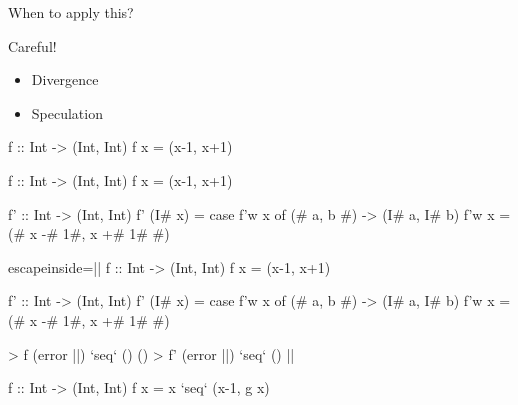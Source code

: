 \documentclass{haskellbeamer}
\begin{document}
\begin{frame}[fragile]{When to apply this?}
    \begin{minipage}{0.39\textwidth}
      Careful!
      \begin{itemize}
        \item<1-> Divergence
        \item<4-> Speculation
      \end{itemize}
    \end{minipage}%
    \begin{minipage}{0.6\textwidth}
      \begin{center}
        \begin{overprint}
          \begin{haskell}
            f :: Int -> (Int, Int)
            f x = (x-1, x+1)
          \end{haskell}
          \begin{haskell}
            f :: Int -> (Int, Int)
            f x = (x-1, x+1)
            
            f' :: Int -> (Int, Int)
            f' (I# x) = case f'w x of
              (# a, b #) -> (I# a, I# b)
            f'w x = (# x -# 1#, x +# 1# #)
          \end{haskell}
          \begin{haskell*}{escapeinside=||}
            f :: Int -> (Int, Int)
            f x = (x-1, x+1)
            
            f' :: Int -> (Int, Int)
            f' (I# x) = case f'w x of
              (# a, b #) -> (I# a, I# b)
            f'w x = (# x -# 1#, x +# 1# #)

            > f (error ||) `seq` ()
            ()
            > f' (error ||) `seq` ()
            ||
          \end{haskell*}
          \begin{haskell}
            f :: Int -> (Int, Int)
            f x = x `seq` (x-1, g x)


\end{haskell}
\end{overprint}
\end{center}
\end{minipage}
\end{frame}
\end{document}
